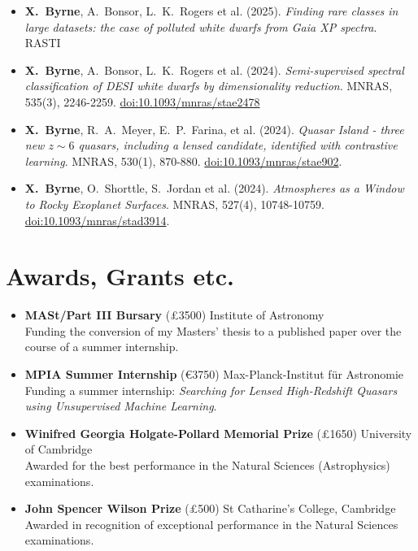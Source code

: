 \documentclass[a4paper,10pt]{article}
\begin{document}
\begin{itemize}
    \item \textbf{X.~Byrne}, A.~Bonsor, L.~K.~Rogers et al. (2025).
    \textit{Finding rare classes in large datasets: the case of polluted white dwarfs from \textit{Gaia} XP spectra}. RASTI%
    \item \textbf{X.~Byrne}, A.~Bonsor, L.~K.~Rogers et al. (2024). 
    \textit{Semi-supervised spectral classification of DESI white dwarfs by dimensionality reduction}. 
    MNRAS, 535(3), 2246-2259.
    \href{https://doi.org/10.1093/mnras/stae2478}{doi:10.1093/mnras/stae2478}
    \item \textbf{X.~Byrne}, R.~A.~Meyer, E.~P.~Farina, et al. (2024).
    \textit{Quasar Island - three new $z\sim6$ quasars, including a lensed candidate, identified with contrastive learning}.
    MNRAS, 530(1), 870-880.
    \href{https://doi.org/10.1093/mnras/stae902}{doi:10.1093/mnras/stae902}.
    \item \textbf{X.~Byrne}, O.~Shorttle, S.~Jordan et al. (2024).
    \textit{Atmospheres as a Window to Rocky Exoplanet Surfaces}.
    MNRAS, 527(4), 10748-10759.
    \href{https://doi.org/10.1093/mnras/stad3914}{doi:10.1093/mnras/stad3914}.
\end{itemize}

\section*{Awards, Grants etc.}
\begin{itemize}
    \item \textbf{MASt/Part III Bursary} (£3500) \hfill Institute of Astronomy\\
    Funding the conversion of my Masters' thesis to a published paper over the course of a summer internship.
    \item \textbf{MPIA Summer Internship} (€3750) \hfill Max-Planck-Institut f\"{u}r Astronomie\\
    Funding a summer internship: \textit{Searching for Lensed High-Redshift Quasars using Unsupervised Machine Learning}.
    \item \textbf{Winifred Georgia Holgate-Pollard Memorial Prize} (£1650)
    \hfill University of Cambridge\\
    Awarded for the best performance in the Natural Sciences (Astrophysics) examinations.
    \item \textbf{John Spencer Wilson Prize} (£500) \hfill St Catharine's College, Cambridge\\
    Awarded in recognition of exceptional performance in the Natural Sciences examinations.
\end{itemize}
\end{document}
